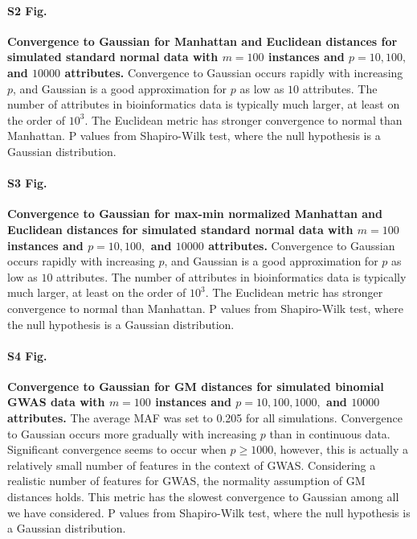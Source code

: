 \documentclass[10pt,letterpaper]{article}
\begin{document}
\paragraph*{S2 Fig.}
\hypertarget{S2_Fig}{
{\bf Convergence to Gaussian for Manhattan and Euclidean distances for simulated standard normal data with $m=100$ instances and $p=10, 100,$ and $10000$ attributes.} Convergence to Gaussian occurs rapidly with increasing $p$, and Gaussian is a good approximation for $p$ as low as $10$ attributes. The number of attributes in bioinformatics data is typically much larger, at least on the order of $10^3$. The Euclidean metric has stronger convergence to normal than Manhattan.  P values from Shapiro-Wilk test, where the null hypothesis is a Gaussian distribution.}

\paragraph*{S3 Fig.}
\hypertarget{S3_Fig}{
{\bf Convergence to Gaussian for max-min normalized Manhattan and Euclidean distances for simulated standard normal data with $m=100$ instances and $p=10, 100,$ and $10000$ attributes.} Convergence to Gaussian occurs rapidly with increasing $p$, and Gaussian is a good approximation for $p$ as low as $10$ attributes. The number of attributes in bioinformatics data is typically much larger, at least on the order of $10^3$. The Euclidean metric has stronger convergence to normal than Manhattan.  P values from Shapiro-Wilk test, where the null hypothesis is a Gaussian distribution.}

\paragraph*{S4 Fig.}
\hypertarget{S4_Fig}{
{\bf Convergence to Gaussian for GM distances for simulated binomial GWAS data with $m=100$ instances and $p=10, 100, 1000,$ and $10000$ attributes.} The average MAF was set to 0.205 for all simulations. Convergence to Gaussian occurs more gradually with increasing $p$ than in continuous data. Significant convergence seems to occur when $p \geq 1000$, however, this is actually a relatively small number of features in the context of GWAS. Considering a realistic number of features for GWAS, the normality assumption of GM distances holds. This metric has the slowest convergence to Gaussian among all we have considered. P values from Shapiro-Wilk test, where the null hypothesis is a Gaussian distribution.}
\end{document}
